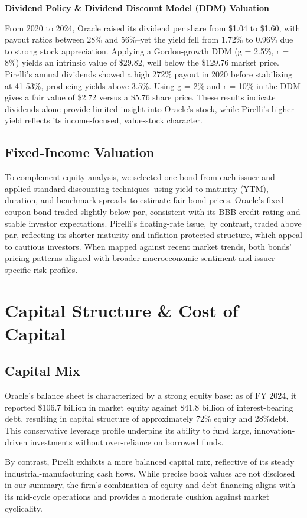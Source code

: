 \documentclass[12pt,a4paper]{report}
\begin{document}
\textbf{Dividend Policy \& Dividend Discount Model (DDM) Valuation}

From 2020 to 2024, Oracle raised its dividend per share from \$1.04 to \$1.60, with payout ratios between 28\% and 56\%--yet the yield fell from 1.72\% to 0.96\% due to strong stock appreciation. Applying a Gordon-growth DDM (g = 2.5\%, r = 8\%) yields an intrinsic value of \$29.82, well below the \$129.76 market price. Pirelli's annual dividends showed a high 272\% payout in 2020 before stabilizing at 41-53\%, producing yields above 3.5\%. Using g = 2\% and r = 10\% in the DDM gives a fair value of \$2.72 versus a \$5.76 share price. These results indicate dividends alone provide limited insight into Oracle's stock, while Pirelli's higher yield reflects its income-focused, value-stock character.

\section{Fixed-Income Valuation}
To complement equity analysis, we selected one bond from each issuer and applied standard discounting techniques--using yield to maturity (YTM), duration, and benchmark spreads--to estimate fair bond prices. Oracle's fixed-coupon bond traded slightly below par, consistent with its BBB credit rating and stable investor expectations. Pirelli's floating-rate issue, by contrast, traded above par, reflecting its shorter maturity and inflation-protected structure, which appeal to cautious investors. When mapped against recent market trends, both bonds' pricing patterns aligned with broader macroeconomic sentiment and issuer-specific risk profiles.

\chapter{Capital Structure \& Cost of Capital}
\section{Capital Mix}
Oracle's balance sheet is characterized by a strong equity base: as of FY 2024, it reported \$106.7 billion in market equity against \$41.8 billion of interest-bearing debt, resulting in capital structure of approximately 72\% equity and 28\%debt. This conservative leverage profile underpins its ability to fund large, innovation-driven investments without over-reliance on borrowed funds.

By contrast, Pirelli exhibits a more balanced capital mix, reflective of its steady industrial-manufacturing cash flows. While precise book values are not disclosed in our summary, the firm's combination of equity and debt financing aligns with its mid-cycle operations and provides a moderate cushion against market cyclicality.
\end{document}
